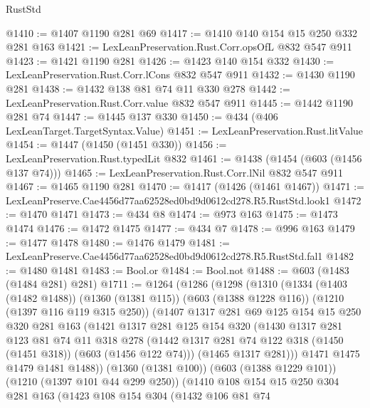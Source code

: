 \begin{lexlean}{RustStd}
\begin{coremodule}
@1410 := @1407 @1190 @281 @69
@1417 := @1410 @140 @154 @15 @250 @332 @281 @163
@1421 := LexLeanPreservation.Rust.Corr.opsOfL @832 @547 @911
@1423 := @1421 @1190 @281
@1426 := @1423 @140 @154 @332
@1430 := LexLeanPreservation.Rust.Corr.lCons @832 @547 @911
@1432 := @1430 @1190 @281
@1438 := @1432 @138 @81 @74 @11 @330 @278
@1442 := LexLeanPreservation.Rust.Corr.value @832 @547 @911
@1445 := @1442 @1190 @281 @74
@1447 := @1445 @137 @330
@1450 := @434 (@406 LexLeanTarget.TargetSyntax.Value)
@1451 := LexLeanPreservation.Rust.litValue
@1454 := @1447 (@1450 (@1451 @330))
@1456 := LexLeanPreservation.Rust.typedLit @832
@1461 := @1438 (@1454 (@603 (@1456 @137 @74)))
@1465 := LexLeanPreservation.Rust.Corr.lNil @832 @547 @911
@1467 := @1465 @1190 @281
@1470 := @1417 (@1426 (@1461 @1467))
@1471 := LexLeanPreserve.Cae4456d77aa62528ed0bd9d0612cd278.R5.RustStd.look1
@1472 := @1470 @1471
@1473 := @434 @8
@1474 := @973 @163
@1475 := @1473 @1474
@1476 := @1472 @1475
@1477 := @434 @7
@1478 := @996 @163
@1479 := @1477 @1478
@1480 := @1476 @1479
@1481 := LexLeanPreserve.Cae4456d77aa62528ed0bd9d0612cd278.R5.RustStd.fal1
@1482 := @1480 @1481
@1483 := Bool.or
@1484 := Bool.not
@1488 := @603 (@1483 (@1484 @281) @281)
@1711 := @1264
    (@1286
      (@1298
        (@1310
          (@1334
            (@1403 (@1482 @1488))
            (@1360 (@1381 @115))
            (@603 (@1388 @1228 @116))
            (@1210 (@1397 @116 @119 @315 @250))
            (@1407
              @1317
              @281
              @69
              @125
              @154
              @15
              @250
              @320
              @281
              @163
              (@1421
                @1317
                @281
                @125
                @154
                @320
                (@1430
                  @1317
                  @281
                  @123
                  @81
                  @74
                  @11
                  @318
                  @278
                  (@1442 @1317 @281 @74 @122 @318 (@1450 (@1451 @318)) (@603 (@1456 @122 @74)))
                  (@1465 @1317 @281)))
              @1471
              @1475
              @1479
              @1481
              @1488))
          (@1360 (@1381 @100))
          (@603 (@1388 @1229 @101))
          (@1210 (@1397 @101 @44 @299 @250))
          (@1410
            @108
            @154
            @15
            @250
            @304
            @281
            @163
            (@1423
              @108
              @154
              @304
              (@1432
                @106
                @81
                @74

\end{coremodule}
\end{lexlean}
